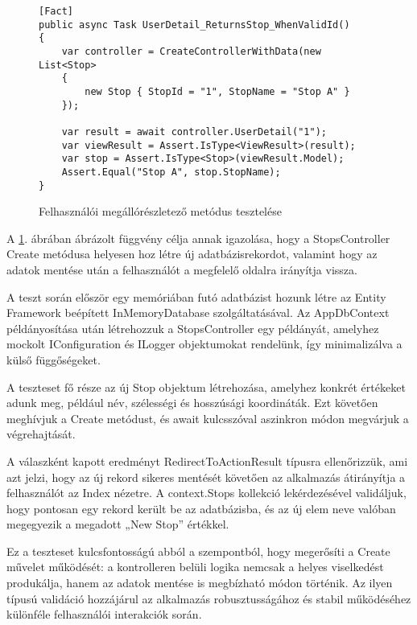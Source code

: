 \begin{figure}[H]
\caption{Felhasználói megállórészletező metódus tesztelése}
\label{fig:userdetail-test-method}
\begin{minipage}{\textwidth}
\begin{BVerbatim}
[Fact]
public async Task UserDetail_ReturnsStop_WhenValidId()
{
    var controller = CreateControllerWithData(new List<Stop>
    {
        new Stop { StopId = "1", StopName = "Stop A" }
    });

    var result = await controller.UserDetail("1");
    var viewResult = Assert.IsType<ViewResult>(result);
    var stop = Assert.IsType<Stop>(viewResult.Model);
    Assert.Equal("Stop A", stop.StopName);
}
\end{BVerbatim}
\end{minipage}
\end{figure}

A \ref{fig:userdetail-test-method}. ábrában ábrázolt függvény célja annak igazolása, hogy a StopsController Create metódusa helyesen hoz létre új adatbázisrekordot, valamint hogy az adatok mentése után a felhasználót a megfelelő oldalra irányítja vissza.

A teszt során először egy memóriában futó adatbázist hozunk létre az Entity Framework beépített InMemoryDatabase szolgáltatásával.  Az AppDbContext példányosítása után létrehozzuk a StopsController egy példányát, amelyhez mockolt IConfiguration és ILogger objektumokat rendelünk, így minimalizálva a külső függőségeket.

A teszteset fő része az új Stop objektum létrehozása, amelyhez konkrét értékeket adunk meg, például név, szélességi és hosszúsági koordináták. Ezt követően meghívjuk a Create metódust, és await kulcsszóval aszinkron módon megvárjuk a végrehajtását.

A válaszként kapott eredményt RedirectToActionResult típusra ellenőrizzük, ami azt jelzi, hogy az új rekord sikeres mentését követően az alkalmazás átirányítja a felhasználót az Index nézetre. A context.Stops kollekció lekérdezésével validáljuk, hogy pontosan egy rekord került be az adatbázisba, és az új elem neve valóban megegyezik a megadott „New Stop” értékkel.

Ez a teszteset kulcsfontosságú abból a szempontból, hogy megerősíti a Create művelet működését: a kontrolleren belüli logika nemcsak a helyes viselkedést produkálja, hanem az adatok mentése is megbízható módon történik. Az ilyen típusú validáció hozzájárul az alkalmazás robusztusságához és stabil működéséhez különféle felhasználói interakciók során.

